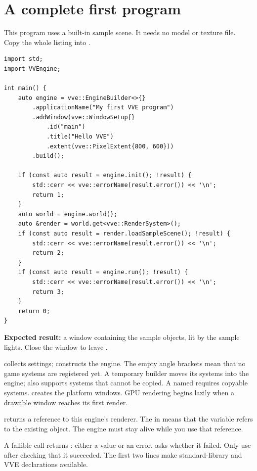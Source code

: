 \documentclass[11pt,a4paper]{article}
\begin{document}
\section{A complete first program}
This program uses a built-in sample scene. It needs no model or texture file. Copy the whole listing into .
\begin{lstlisting}
import std;
import VVEngine;

int main() {
    auto engine = vve::EngineBuilder<>{}
        .applicationName("My first VVE program")
        .addWindow(vve::WindowSetup{}
            .id("main")
            .title("Hello VVE")
            .extent(vve::PixelExtent{800, 600}))
        .build();

    if (const auto result = engine.init(); !result) {
        std::cerr << vve::errorName(result.error()) << '\n';
        return 1;
    }
    auto world = engine.world();
    auto &render = world.get<vve::RenderSystem>();
    if (const auto result = render.loadSampleScene(); !result) {
        std::cerr << vve::errorName(result.error()) << '\n';
        return 2;
    }
    if (const auto result = engine.run(); !result) {
        std::cerr << vve::errorName(result.error()) << '\n';
        return 3;
    }
    return 0;
}
\end{lstlisting}
\textbf{Expected result:} a window containing the sample objects, lit by the sample lights. Close the window to leave .

 collects settings;  constructs the engine. The empty angle brackets mean that no game systems are registered yet. A temporary builder moves its systems into the engine;  also supports systems that cannot be copied. A named  requires copyable systems.  creates the platform windows. GPU rendering begins lazily when a drawable window reaches its first render.

 returns a reference to this engine's renderer. The \api{&} in  means that the variable refers to the existing object. The engine must stay alive while you use that reference.

A fallible call returns : either a value or an error.  asks whether it failed. Only use  after checking that it succeeded. The first two  lines make standard-library and VVE declarations available.
\end{document}
